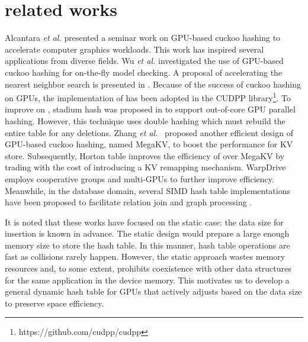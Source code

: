 \section{related works}\label{sec:rel}
Alcantara \textit{et al.} \cite{alcantara2009real} presented a seminar work on GPU-based cuckoo hashing to accelerate computer graphics workloads. 
This work has inspired several applications from diverse fields. Wu \textit{et al.} \cite{wu2015gpu} investigated the use of GPU-based cuckoo hashing for on-the-fly model checking. 
A proposal of accelerating the nearest neighbor search is presented in \cite{pan2010efficient}. 
Because of the success of cuckoo hashing on GPUs, the implementation of \cite{alcantara2009real} has been adopted in the CUDPP library\footnote{https://github.com/cudpp/cudpp}.
To improve on \cite{alcantara2009real}, stadium hash was proposed in \cite{khorasani2015stadium} to support out-of-core GPU parallel hashing. However, this technique uses double hashing which must rebuild the entire table for any deletions.  
Zhang \textit{et al.}~\cite{zhang2015mega} proposed another efficient design of GPU-based cuckoo hashing, named MegaKV, 
to boost the performance for KV store. 
Subsequently, Horton table \cite{breslow2016horton} improves the efficiency of  over MegaKV by trading with the cost of introducing a KV remapping mechanism.
WarpDrive \cite{junger2018warpdrive} employs cooperative groups and multi-GPUs to further improve efficiency.
Meanwhile, in the database domain, several SIMD hash table implementations have been proposed to facilitate relation join and graph processing \cite{ross2007efficient,zhong2014medusa}. 

It is noted that these works have focused on the static case: the data size for insertion is known in advance. The static design would prepare a large enough memory size to store the hash table. In this manner, hash table operations are fast as collisions rarely happen. However, the static approach wastes memory resources and, to some extent, prohibits coexistence with other data structures for the same application in the device memory. 
This motivates us to develop a general dynamic hash table for GPUs that actively adjusts based on the data size to preserve space efficiency. 

